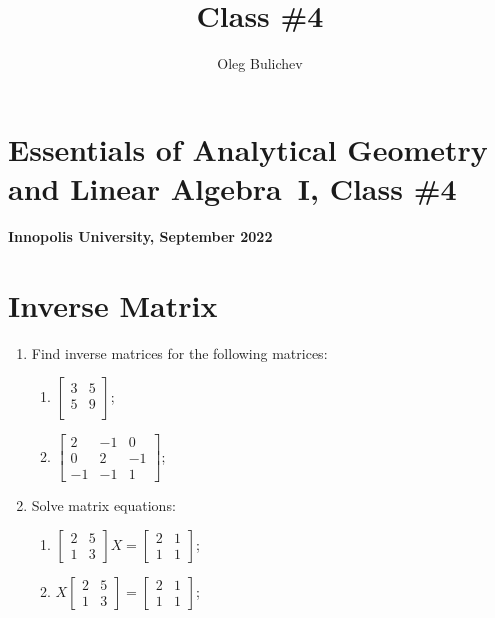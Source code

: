 \documentclass[a4paper,10pt]{article}
\title{Class \#4}
\author{Oleg Bulichev}
\date{}
\begin{document}
\section*{Essentials of Analytical Geometry and Linear Algebra~I, Class \#4}
\noindent\textbf{Innopolis University, September 2022}
\\


\section{Inverse Matrix}
\begin{enumerate}
\item Find inverse matrices for the following matrices:
\begin{enumerate}

    \item $\begin{bmatrix}
     3 & 5 \\
     5 & 9 \\
   \end{bmatrix}$;
    \item $\begin{bmatrix}2&-1&0\\0&2&-1\\-1&-1&1\end{bmatrix}$;
\end{enumerate}


\item Solve matrix equations:
\begin{enumerate}

    \item $\begin{bmatrix}2&5\\1&3\end{bmatrix}X=\begin{bmatrix}2&1\\1&1\end{bmatrix}$;
    \item  $X\begin{bmatrix}2&5\\1&3\end{bmatrix}=\begin{bmatrix}2&1\\1&1\end{bmatrix}$;
\end{enumerate}

\end{enumerate}
\end{document}
